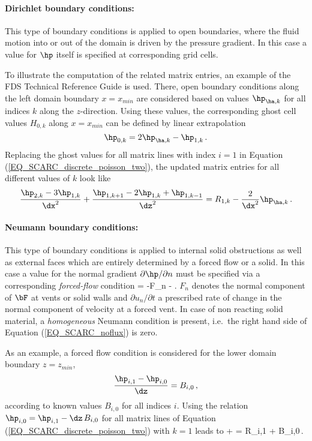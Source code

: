 \vspace{0.2cm}
\paragraph{Dirichlet boundary conditions:} 
This type of boundary conditions is
applied to open boundaries, where the fluid motion into or out of the domain is driven by the pressure gradient. In this case a value for $\hp$ itself is specified at corresponding grid cells. 

To illustrate the computation of the related matrix entries, an example of the FDS Technical Reference Guide \cite{McGrattan:2018:TG} is used. There, open boundary conditions along the left domain boundary $x = x_{min}$ are considered based on values $\hp_{\ha,k}$ for all indices $k$ along the $z$-direction.
Using these values, the corresponding ghost cell values $H_{0,k}$ along $x = x_{min}$ can be defined by linear extrapolation
\[
\hp_{0,k} = 2 \hp_{\ha,k} - \hp_{1,k}\,.
\]
Replacing the ghost values for all matrix lines with index $i=1$ in Equation (\ref{EQ_SCARC_discrete_poisson_two}), the updated matrix entries for all different values of $k$ look like
\[
\frac{\hp_{2,k}-3\hp_{1,k}}{\dx^2} +
\frac{\hp_{1,k+1}-2\hp_{1,k}+\hp_{1,k-1}}{\dz^2}   
= R_{1,k} - \frac{2}{\dx^2}\hp_{\ha,k}\,.
\]

\vspace{0.2cm}
\paragraph{Neumann boundary conditions:} 
This type of boundary conditions is applied to internal solid obstructions as well as external faces which are entirely determined by a forced flow or a solid. In this case a value for the normal gradient $\partial \hp/\partial n$ must be specified via a corresponding {\it forced-flow} condition
\be 
   = -F_n - . 
  \label{EQ_SCARC_noflux}
\ee
$F_n$ denotes the normal component of $\bF$ at vents or solid walls and $\partial u_n/\partial t$
a prescribed rate of change in the normal component  of velocity at a forced vent. In case of non reacting solid material, a {\it homogeneous} Neumann condition is present, i.e.\ the right hand side of Equation (\ref{EQ_SCARC_noflux}) is zero.

\newpage
As an example, a forced flow condition is considered for the lower domain boundary $z=z_{min}$,
\[
\frac{\hp_{i,1}-\hp_{i,0}}{\dz} = B_{i,0}\,, 
\]
according to known values $B_{i,0}$ for all indices $i$.
Using the relation $\hp_{i,0}= \hp_{i,1} - \dz \, B_{i,0}$ for all matrix lines  of Equation (\ref{EQ_SCARC_discrete_poisson_two}) with $k=1$ leads to
\be
{} +
 \notag  = R_{i,1} + B_{i,0}\,.
\ee


